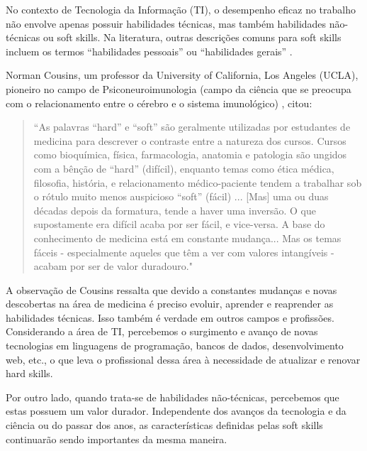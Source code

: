No contexto de Tecnologia da Informação (TI), o desempenho eficaz no trabalho não envolve apenas possuir habilidades técnicas, mas também habilidades não-técnicas ou soft skills. Na literatura, outras descrições comuns para soft skills incluem os termos ``habilidades pessoais'' ou ``habilidades gerais'' \cite{joseph:99}.

Norman Cousins, um professor da University of California, Los Angeles (UCLA), pioneiro no campo de Psiconeuroimunologia (campo da ciência que se preocupa com o relacionamento entre o cérebro e o sistema imunológico) \cite{crosbie:05}, citou:

\begin{quote}
``As palavras ``hard'' e ``soft'' são geralmente utilizadas por estudantes de medicina para descrever o contraste entre a natureza dos cursos. Cursos como bioquímica, física, farmacologia, anatomia e patologia são ungidos com a bênção de ``hard'' (difícil), enquanto temas como ética médica, filosofia, história, e relacionamento médico-paciente tendem a trabalhar sob o rótulo muito menos auspicioso ``soft'' (fácil) 
... [Mas] uma ou duas décadas depois da formatura, tende a haver uma inversão. O que supostamente era difícil acaba por ser fácil, e vice-versa.
A base do conhecimento de medicina está em constante mudança... Mas os temas fáceis - especialmente aqueles que têm a ver com valores intangíveis - acabam por ser de valor duradouro."
\end{quote}

A observação de Cousins ressalta que devido a constantes mudanças e novas descobertas na área de medicina é preciso evoluir, aprender e reaprender as habilidades técnicas. Isso também é verdade em outros campos e profissões. Considerando a área de TI, percebemos o surgimento e avanço de novas tecnologias em linguagens de programação, bancos de dados, desenvolvimento web, etc., o que leva o profissional dessa área à necessidade de atualizar e renovar hard skills.

Por outro lado, quando trata-se de habilidades não-técnicas, percebemos que estas possuem um valor durador. Independente dos avanços da tecnologia e da ciência ou do passar dos anos, as características definidas pelas soft skills continuarão sendo importantes da mesma maneira.

